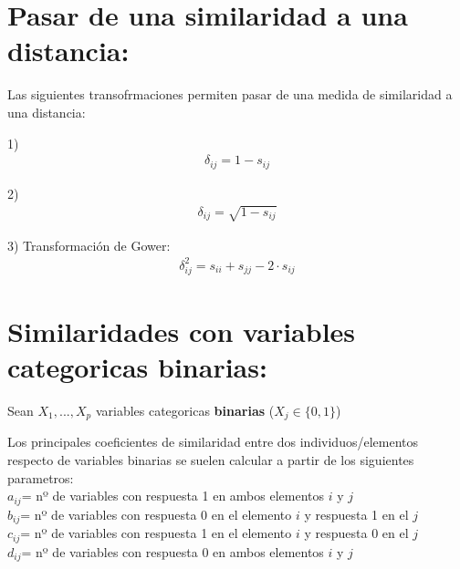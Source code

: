 \documentclass[12pt]{report} %
\begin{document}
\section{Pasar de una similaridad a una distancia:}

\begin{tcolorbox}[toptitle=2mm,title= Pasar de una similaridad a una distancia:   ]

Las siguientes transofrmaciones permiten pasar de una medida de similaridad a una distancia: 
\vspace{0.15cm}

1) \begin{gather*}
\delta_{ij}=1-s_{ij}
\end{gather*}

2) \begin{gather*}
\delta_{ij}=\sqrt{1-s_{ij}}  
\end{gather*}

3) Transformación de Gower:
\begin{gather*}
\delta^2_{ij} = s_{ii} + s_{jj} - 2\cdot s_{ij}
\end{gather*}

\end{tcolorbox}

\section{Similaridades con variables categoricas binarias:}

Sean $X_1,...,X_p$ variables categoricas \textbf{binarias} ($X_j \in \lbrace 0,1 \rbrace$) 

\begin{tcolorbox}[toptitle=2mm,title=     ]

Los principales coeficientes de similaridad entre dos individuos/elementos respecto de variables binarias se suelen calcular a partir de los siguientes parametros:\\

 $a_{ij}$\hspace{0.1cm}=\hspace{0.1cm} nº de variables con respuesta  1 en ambos elementos $i$ y $j$  \\

  $b_{ij}$\hspace{0.1cm}=\hspace{0.1cm} nº de variables con respuesta  0 en el  elemento $i$ y respuesta 1 en el $j$ \\

 $c_{ij}$\hspace{0.1cm}=\hspace{0.1cm} nº de variables con respuesta  1 en el  elemento $i$ y respuesta 0 en el $j$ \\

  $d_{ij}$\hspace{0.1cm}=\hspace{0.1cm} nº de variables con respuesta  0 en ambos elementos $i$ y $j$ 

\end{tcolorbox}
\end{document}

